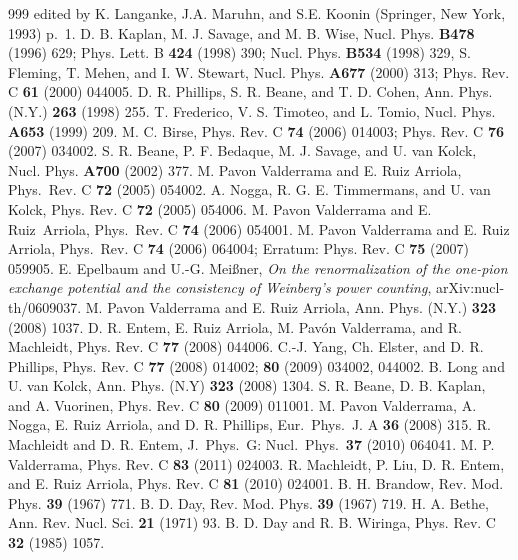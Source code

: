 \documentclass[sort&compress,preprint,3p]{elsarticle}
\begin{document}
\begin{thebibliography}{999}
edited by K. Langanke, J.A. Maruhn, and S.E. Koonin (Springer, New York, 1993)
p.~1.
D. B. Kaplan, M. J. Savage, and M. B. Wise,  
Nucl. Phys. {\bf B478} (1996) 629;
Phys. Lett. B {\bf 424} (1998) 390;
Nucl. Phys. {\bf B534} (1998) 329,
S. Fleming, T. Mehen, and I. W. Stewart,
Nucl. Phys. {\bf A677} (2000) 313;
Phys. Rev. C {\bf 61} (2000) 044005.
D. R. Phillips, S. R. Beane, and T. D. Cohen, 
Ann. Phys. (N.Y.) {\bf 263} (1998) 255.
T. Frederico, V. S. Timoteo, and L. Tomio, 
Nucl. Phys. {\bf A653} (1999) 209.
M. C. Birse, { Phys. Rev.} C {\bf 74} (2006) 014003;
Phys. Rev. C {\bf 76} (2007) 034002.
S. R. Beane, P. F. Bedaque, M. J. Savage, and U. van Kolck, 
Nucl. Phys. {\bf A700} (2002) 377.
M. Pavon Valderrama and E. Ruiz Arriola,
Phys.\ Rev.  C {\bf 72}  (2005) 054002.
A. Nogga, R. G. E. Timmermans, and U. van Kolck,
Phys. Rev. C {\bf 72} (2005) 054006.
M. Pavon Valderrama and E. Ruiz~Arriola,
Phys.\ Rev.  C {\bf 74}  (2006) 054001. 
M. Pavon Valderrama and E. Ruiz Arriola, 
Phys.\ Rev.  C {\bf 74}  (2006) 064004;
Erratum: Phys. Rev. C {\bf 75} (2007) 059905.
E. Epelbaum and U.-G. Mei\ss ner,
{\it On the renormalization of the one-pion exchange potential and the consistency of
Weinberg's power counting},
arXiv:nucl-th/0609037.
M. Pavon Valderrama and E. Ruiz Arriola, 
Ann. Phys. (N.Y.) {\bf 323} (2008) 1037.
 D. R. Entem, E. Ruiz Arriola, M. Pav\'on Valderrama, and R. Machleidt,
Phys. Rev. C {\bf 77} (2008) 044006.
C.-J. Yang, Ch. Elster, and D. R. Phillips, 
Phys. Rev. C {\bf 77} (2008) 014002;
{\bf 80} (2009) 034002,  044002.
 B. Long and U. van Kolck, 
Ann. Phys. (N.Y) {\bf 323} (2008) 1304.
 S. R. Beane, D. B. Kaplan, and A. Vuorinen,
Phys. Rev. C {\bf 80} (2009) 011001.
M. Pavon Valderrama, A. Nogga, E. Ruiz Arriola, and D. R. Phillips,
Eur.\ Phys.\ J.  A {\bf 36} (2008) 315.
  R. Machleidt and D. R. Entem,
J.\ Phys.\ G: Nucl.\ Phys.\ {\bf 37} (2010) 064041.
M. P. Valderrama,
Phys. Rev. C {\bf 83} (2011) 024003.
R. Machleidt, P. Liu, D. R. Entem, and E. Ruiz Arriola,
Phys. Rev. C {\bf 81} (2010) 024001.
B. H. Brandow, Rev. Mod. Phys. {\bf 39} (1967) 771.
B. D. Day, Rev. Mod. Phys. {\bf 39} (1967) 719.
H. A. Bethe, Ann. Rev. Nucl. Sci. {\bf 21} (1971) 93.
B. D. Day and R. B. Wiringa, Phys. Rev. C {\bf 32} (1985) 1057.

\end{thebibliography}
\end{document}
